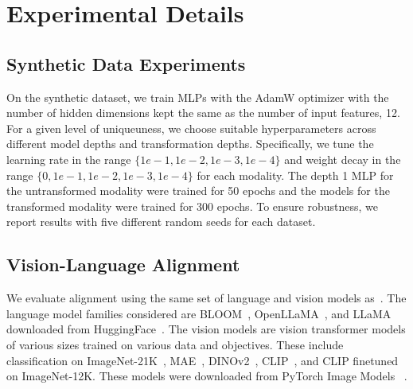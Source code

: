 \newpage
\appendix
\onecolumn



\section{Experimental Details}\label{app:experiment_details}

\subsection{Synthetic Data Experiments}
On the synthetic dataset, we train MLPs with the AdamW optimizer with the number of hidden dimensions kept the same as the number of input features, 12. For a given level of uniqueuness, we choose suitable hyperparameters across different model depths and transformation depths. Specifically, we tune the learning rate in the range $\{ 1e-1, 1e-2, 1e-3, 1e-4\}$ and weight decay in the range $\{0, 1e-1, 1e-2, 1e-3, 1e-4\}$ for each modality. The depth 1 MLP for the untransformed modality were trained for 50 epochs and the models for the transformed modality were trained for 300 epochs. To ensure robustness, we report results with five different random seeds for each dataset.

\subsection{Vision-Language Alignment}

We evaluate alignment using the same set of language and vision models as~\citet{huh_platonic_2024}. The language model families considered are BLOOM~\cite{workshop_bloom_2023}, OpenLLaMA~\cite{geng_openllama_2023}, and LLaMA~\cite{touvron_llama_2023} downloaded from HuggingFace~\cite{wolf_transformers_2020}. The vision models are vision transformer models of various sizes trained on various data and objectives. These include classification on ImageNet-21K~\cite{russakovsky_imagenet_2015}, MAE~\cite{heMaskedAutoencodersAre2022}, DINOv2~\cite{oquab_dinov2_2023}, CLIP~\cite{radford_learning_2021}, and CLIP finetuned on ImageNet-12K. These
models were downloaded from PyTorch Image Models ~\cite{wightman_pytorch_2019}.


